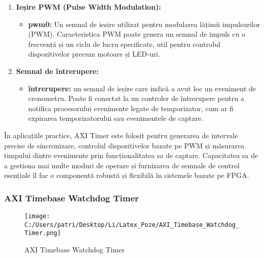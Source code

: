 \documentclass[12pt]{article}
\begin{document}
\begin{enumerate}
\begin{itemize}
    \end{itemize}
    \item \textbf{Ieșire PWM (Pulse Width Modulation):}
    \begin{itemize}
        \item \textbf{pwm0:} Un semnal de ieșire utilizat pentru modularea lățimii impulsurilor (PWM). Caracteristica PWM poate genera un semnal de impuls cu o frecvență și un ciclu de lucru specificate, util pentru controlul dispozitivelor precum motoare și LED-uri.
    \end{itemize}
    \item \textbf{Semnal de întrerupere:}
    \begin{itemize}
        \item \textbf{întrerupere:} un semnal de ieșire care indică a avut loc un eveniment de cronometru. Poate fi conectat la un controler de întrerupere pentru a notifica procesorului evenimente legate de temporizator, cum ar fi expirarea temporizatorului sau evenimentele de captare.
    \end{itemize}
\end{enumerate}
\hspace*{1cm}În aplicațiile practice, AXI Timer este folosit pentru generarea de intervale precise de sincronizare, controlul dispozitivelor bazate pe PWM și măsurarea timpului dintre evenimente prin funcționalitatea sa de captare. Capacitatea sa de a gestiona mai multe moduri de operare și furnizarea de semnale de control esențiale îl fac o componentă robustă și flexibilă în sistemele bazate pe FPGA.



\subsubsection{AXI Timebase Watchdog Timer}

\begin{figure}[H]
    \centering
    \texttt{[image: C:/Users/patri/Desktop/Li/Latex\_Poze/AXI\_Timebase\_Watchdog\_Timer.png]}
    \caption{AXI Timebase Watchdog Timer}
\end{figure}
\end{document}
